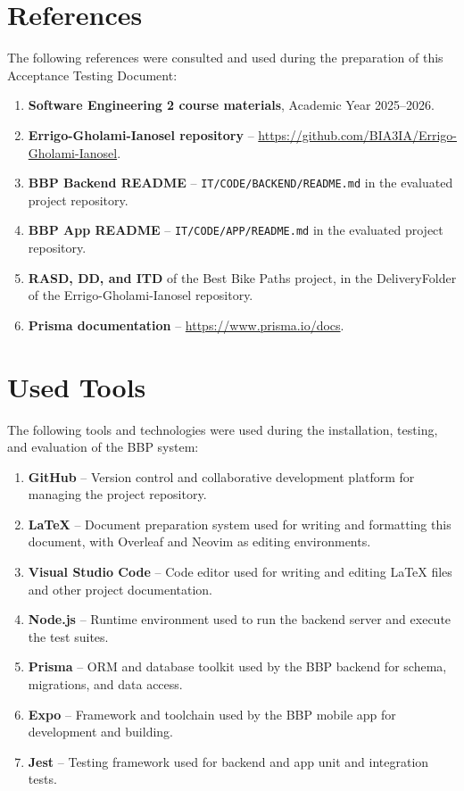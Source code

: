 \section{References}
\label{sec:references}%

The following references were consulted and used during the preparation of this Acceptance Testing Document:

\begin{enumerate}
    \item \textbf{Software Engineering 2 course materials}, Academic Year 2025--2026.
    \item \textbf{Errigo-Gholami-Ianosel repository} -- \href{https://github.com/BIA3IA/Errigo-Gholami-Ianosel}{https://github.com/BIA3IA/Errigo-Gholami-Ianosel}.
    \item \textbf{BBP Backend README} -- \texttt{IT/CODE/BACKEND/README.md} in the evaluated project repository.
    \item \textbf{BBP App README} -- \texttt{IT/CODE/APP/README.md} in the evaluated project repository.
    \item \textbf{RASD, DD, and ITD} of the Best Bike Paths project, in the DeliveryFolder of the Errigo-Gholami-Ianosel repository.
    \item \textbf{Prisma documentation} -- \href{https://www.prisma.io/docs}{https://www.prisma.io/docs}.
\end{enumerate}

\section{Used Tools}
\label{sec:used_tools}%

The following tools and technologies were used during the installation, testing, and evaluation of the BBP system:

\begin{enumerate}
    \item \textbf{GitHub} -- Version control and collaborative development platform for managing the project repository.
    \item \textbf{\LaTeX{}} -- Document preparation system used for writing and formatting this document, with Overleaf and Neovim as editing environments.
    \item \textbf{Visual Studio Code} -- Code editor used for writing and editing \LaTeX{} files and other project documentation.
    \item \textbf{Node.js} -- Runtime environment used to run the backend server and execute the test suites.
    \item \textbf{Prisma} -- ORM and database toolkit used by the BBP backend for schema, migrations, and data access.
    \item \textbf{Expo} -- Framework and toolchain used by the BBP mobile app for development and building.
    \item \textbf{Jest} -- Testing framework used for backend and app unit and integration tests.
\end{enumerate}

